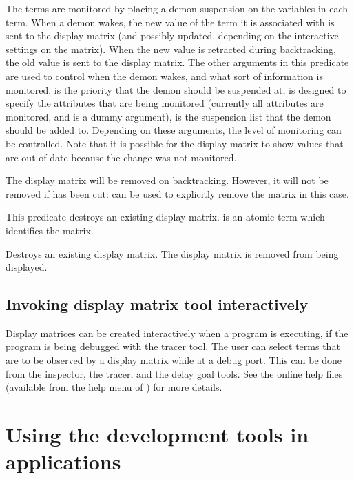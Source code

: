    The terms are monitored by placing a demon suspension on the variables
   in each term. When a demon wakes, the new value of the term it is
   associated with is sent to the display matrix (and possibly updated,
   depending on the interactive settings on the matrix). When the new
   value is retracted during backtracking,
   the old value is sent to the display matrix.
   The other arguments in this predicate are used to control when the
   demon wakes, and what sort of information is monitored.  is the
   priority that the demon should be suspended at,  is designed to
   specify the attributes that are being monitored (currently all
   attributes are monitored, and
    is a dummy argument),  is
   the suspension list that the demon should be added to. Depending on
   these arguments, the level of monitoring can be controlled. Note that
   it is possible for the display matrix to show values that are out of
   date because the change was not monitored.

   The display matrix will be removed on backtracking. However, it will
   not be removed if  has been
   cut:  can be used to explicitly remove
   the
   matrix in this case.

\medskip
\begin{quote}
%
\end{quote}

This predicate destroys an existing
   display matrix.  is an atomic term which identifies the matrix.

   Destroys an existing display matrix. The display matrix is removed
   from being displayed.


\subsection{Invoking display matrix tool interactively}

Display matrices can be created interactively when a program is
executing, if the program is being debugged with the tracer tool. The user
can select terms that are to be observed by a display matrix while at a
debug port. This can be done from the inspector, the tracer, and the delay
goal tools. See the online help files (available from the help menu of
{\tkeclipse}) for more details.

\section{Using the development tools in applications}

